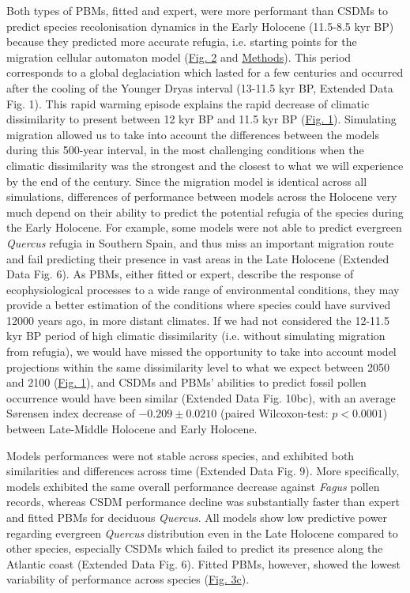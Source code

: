 \documentclass[pdflatex, sn-nature]{sn-jnl}%
\newcommand{\textappr}{\raisebox{0.5ex}{\texttildelow}} %
\begin{document}
Both types of PBMs, fitted and expert, were more performant than CSDMs to predict species recolonisation dynamics in the Early Holocene (\textappr11.5-8.5 kyr BP)  because they predicted more accurate refugia, i.e. starting points for the migration cellular automaton model (\hyperref[quercus_migration]{Fig. 2} and \hyperref[methods]{Methods}). This period  corresponds to a global deglaciation which lasted for a few centuries and occurred after the cooling of the Younger Dryas interval  (\textappr13-11.5 kyr BP, Extended Data Fig. 1). This rapid warming episode explains the rapid decrease of climatic dissimilarity to present between 12 kyr BP and 11.5 kyr BP (\hyperref[climatic_dissimilarity]{Fig. 1}). Simulating migration allowed us to take into account the differences between the models during this 500-year interval, in the most challenging conditions when the climatic dissimilarity was the strongest and the closest to what we will experience by the end of the century. Since the migration model is identical across all simulations, differences of performance between models across the Holocene very much depend on their ability to predict the potential refugia of the species during the Early Holocene. For example, some models were not able to predict evergreen \emph{Quercus} refugia in Southern Spain, and thus miss an important migration route and fail predicting their presence in vast areas in the Late Holocene (Extended Data Fig. 6). As PBMs, either fitted or expert, describe the response of ecophysiological processes to a wide range of environmental conditions, they may provide a better estimation of the conditions where species could have survived 12000 years ago, in more distant climates. If we had not considered the 12-11.5 kyr BP period of high climatic dissimilarity (i.e. without simulating migration from refugia), we would have missed the opportunity to take into account model projections within the same dissimilarity level to what we expect between 2050 and 2100 (\hyperref[climatic_dissimilarity]{Fig. 1}), and CSDMs and PBMs' abilities to predict fossil pollen occurrence would have been similar (Extended Data Fig. 10bc), with an average Sørensen index decrease of $-0.209\pm0.0210$ (paired Wilcoxon-test: $p<0.0001$) between Late-Middle Holocene and Early Holocene.

Models performances were not stable across species, and exhibited both similarities and differences across time (Extended Data Fig. 9). More specifically, models exhibited the same overall performance decrease against \emph{Fagus} pollen records, whereas CSDM performance decline was substantially faster than expert and fitted PBMs for deciduous \emph{Quercus}. All models show low predictive power regarding evergreen \emph{Quercus} distribution even in the Late Holocene compared to other species, especially CSDMs which failed to predict its presence along the Atlantic coast (Extended Data Fig. 6). Fitted PBMs, however, showed the lowest variability of performance across species (\hyperref[past_performance]{Fig. 3c}).
\end{document}
